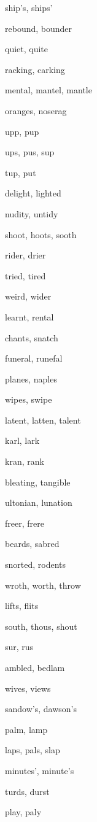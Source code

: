     \item ship's, ships'
    \item rebound, bounder
    \item quiet, quite
    \item racking, carking
    \item mental, mantel, mantle
    \item oranges, noserag
    \item upp, pup
    \item ups, pus, sup
    \item tup, put
    \item delight, lighted
    \item nudity, untidy
    \item shoot, hoots, sooth
    \item rider, drier
    \item tried, tired
    \item weird, wider
    \item learnt, rental
    \item chants, snatch
    \item funeral, runefal
    \item planes, naples
    \item wipes, swipe
    \item latent, latten, talent
    \item karl, lark
    \item kran, rank
    \item bleating, tangible
    \item ultonian, lunation
    \item freer, frere
    \item beards, sabred
    \item snorted, rodents
    \item wroth, worth, throw
    \item lifts, flits
    \item south, thous, shout
    \item sur, rus
    \item ambled, bedlam
    \item wives, views
    \item sandow's, dawson's
    \item palm, lamp
    \item laps, pals, slap
    \item minutes', minute's
    \item turds, durst
    \item play, paly
